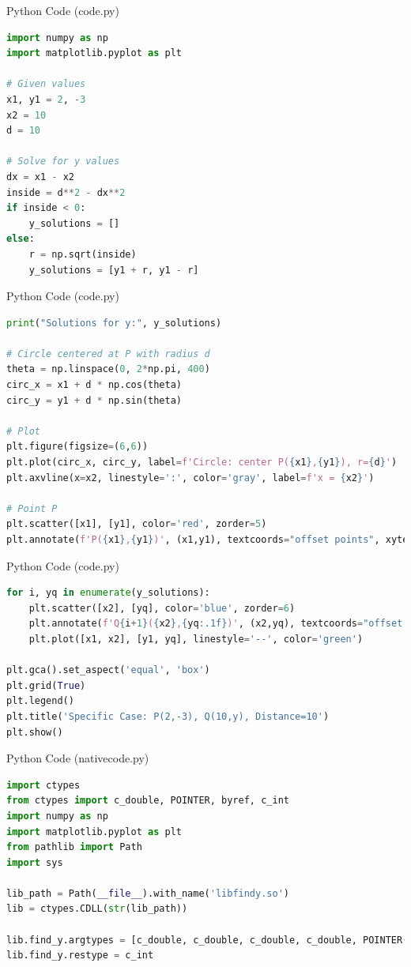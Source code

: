 \documentclass{beamer}
\begin{document}
\begin{frame}[fragile]{Python Code (code.py)}
\begin{lstlisting}[language=Python]
import numpy as np
import matplotlib.pyplot as plt

# Given values
x1, y1 = 2, -3
x2 = 10
d = 10

# Solve for y values
dx = x1 - x2
inside = d**2 - dx**2
if inside < 0:
    y_solutions = []
else:
    r = np.sqrt(inside)
    y_solutions = [y1 + r, y1 - r]
\end{lstlisting}
\end{frame}
\begin{frame}[fragile]{Python Code (code.py)}
\begin{lstlisting}[language=Python]
print("Solutions for y:", y_solutions)

# Circle centered at P with radius d
theta = np.linspace(0, 2*np.pi, 400)
circ_x = x1 + d * np.cos(theta)
circ_y = y1 + d * np.sin(theta)

# Plot
plt.figure(figsize=(6,6))
plt.plot(circ_x, circ_y, label=f'Circle: center P({x1},{y1}), r={d}')
plt.axvline(x=x2, linestyle=':', color='gray', label=f'x = {x2}')

# Point P
plt.scatter([x1], [y1], color='red', zorder=5)
plt.annotate(f'P({x1},{y1})', (x1,y1), textcoords="offset points", xytext=(6,6))
\end{lstlisting}
\end{frame}
\begin{frame}[fragile]{Python Code (code.py)}
\begin{lstlisting}[language=Python]
for i, yq in enumerate(y_solutions):
    plt.scatter([x2], [yq], color='blue', zorder=6)
    plt.annotate(f'Q{i+1}({x2},{yq:.1f})', (x2,yq), textcoords="offset points", xytext=(6,6))
    plt.plot([x1, x2], [y1, yq], linestyle='--', color='green')

plt.gca().set_aspect('equal', 'box')
plt.grid(True)
plt.legend()
plt.title('Specific Case: P(2,-3), Q(10,y), Distance=10')
plt.show()

\end{lstlisting}
\end{frame}
\begin{frame}[fragile]{Python Code (nativecode.py)}
\begin{lstlisting}[language=Python]
import ctypes
from ctypes import c_double, POINTER, byref, c_int
import numpy as np
import matplotlib.pyplot as plt
from pathlib import Path
import sys

lib_path = Path(__file__).with_name('libfindy.so')
lib = ctypes.CDLL(str(lib_path))

lib.find_y.argtypes = [c_double, c_double, c_double, c_double, POINTER(c_double), POINTER(c_double)]
lib.find_y.restype = c_int
\end{lstlisting}
\end{frame}
\end{document}
